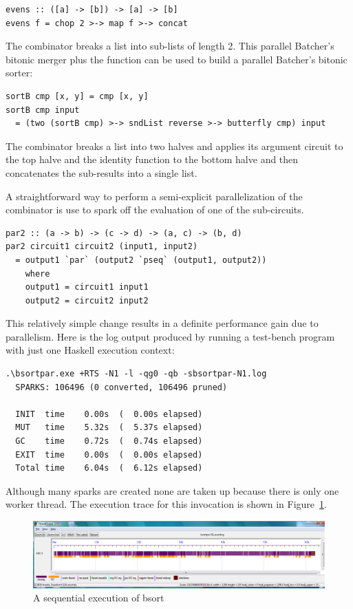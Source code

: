 \begin{lstlisting}
evens :: ([a] -> [b]) -> [a] -> [b]
evens f = chop 2 >-> map f >-> concat
\end{lstlisting}

The  combinator breaks a list into sub-lists of length 2. This parallel Batcher's bitonic merger plus the  function can be used to build a parallel Batcher's bitonic sorter:

\begin{lstlisting}
sortB cmp [x, y] = cmp [x, y]
sortB cmp input
  = (two (sortB cmp) >-> sndList reverse >-> butterfly cmp) input
\end{lstlisting}

The  combinator breaks a list into two halves and applies its argument circuit to the top halve and the identity function to the bottom halve and then concatenates the sub-results into a single list. 

A straightforward way to perform a semi-explicit parallelization of the  combinator is use  to spark off the evaluation of one of the sub-circuits.

\begin{lstlisting}
par2 :: (a -> b) -> (c -> d) -> (a, c) -> (b, d)
par2 circuit1 circuit2 (input1, input2)
  = output1 `par` (output2 `pseq` (output1, output2))
    where
    output1 = circuit1 input1
    output2 = circuit2 input2
\end{lstlisting}

This relatively simple change results in a definite performance gain due to parallelism. Here is the log output produced by running a test-bench program with just one Haskell execution context:

\begin{verbatim}
.\bsortpar.exe +RTS -N1 -l -qg0 -qb -sbsortpar-N1.log
  SPARKS: 106496 (0 converted, 106496 pruned)

  INIT  time    0.00s  (  0.00s elapsed)
  MUT   time    5.32s  (  5.37s elapsed)
  GC    time    0.72s  (  0.74s elapsed)
  EXIT  time    0.00s  (  0.00s elapsed)
  Total time    6.04s  (  6.12s elapsed)
\end{verbatim}

Although many sparks are created none are taken up because there is only one worker thread. The execution trace for this invocation is shown in Figure~\ref{f:bsortpar-n1}.

\begin{figure}
\begin{center}
\includegraphics[width=17cm]{bsortpar-n1.png}
\end{center}
\caption{A sequential execution of bsort}
\label{f:bsortpar-n1}
\end{figure}

